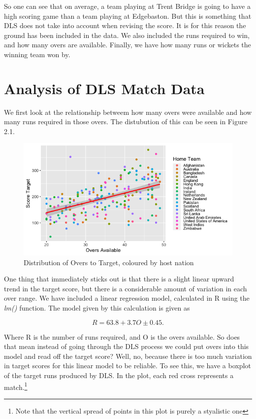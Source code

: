 So one can see that on average, a team playing at Trent Bridge is going to have a high scoring game than a team playing at Edgebaston. But this is something that DLS does
not take into account when revising the score. It is for this reason the ground has been included in the data. We also included the runs required to win, and how many overs
are available. Finally, we have how many runs or wickets the winning team won by. 

\section{Analysis of DLS Match Data}

We first look at the relationship betweem how many overs were available and how many runs required in those overs. The distubution of this can be seen in Figure 2.1.


\begin{figure}[t]
    \centering
    \includegraphics[scale=0.7]{figures/dlsOversScore.png}
    \caption{Distribution of Overs to Target, coloured by host nation }
    \label{figure 2.1}
\end{figure}

One thing that immediately sticks out is that there is a slight linear upward trend in the target score, but there is a considerable amount of variation in each over range. 
We have included a linear regression model, calculated in R using the \textit{lm()} function. The model given by this calculation is given as 

\begin{equation}
    R = 63.8 + 3.7O \pm 0.45.
\end{equation}

Where R is the number of runs required, and O is the overs available. So does that mean instead of going through the DLS process we could put overs into this model and read off the target score?
Well, no, because there is too much variation in target scores for this linear model to be reliable. To see this, we have a boxplot of the target runs produced by DLS. In the plot, each red cross 
represents a match.\footnote{Note that the vertical spread of points in this plot is purely a styalistic one}

